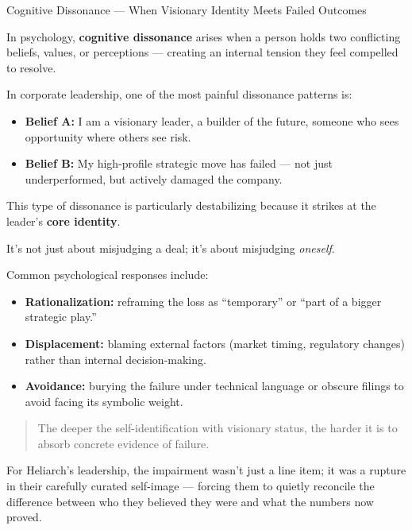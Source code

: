 \begin{PsychologicalSidebar}{Cognitive Dissonance --- When Visionary Identity Meets Failed Outcomes}

    In psychology, \textbf{cognitive dissonance} arises when a person holds two conflicting beliefs, values, or perceptions — creating an internal tension they feel compelled to resolve.
    
    \medskip
    
    In corporate leadership, one of the most painful dissonance patterns is:

    \medskip
    
    \begin{itemize}
        \item \textbf{Belief A:} I am a visionary leader, a builder of the future, someone who sees opportunity where others see risk.
        \item \textbf{Belief B:} My high-profile strategic move has failed — not just underperformed, but actively damaged the company.
    \end{itemize}
    
    \medskip
    
    This type of dissonance is particularly destabilizing because it strikes at the leader’s \textbf{core identity}.

    \medskip
    
    It’s not just about misjudging a deal;  
    it’s about misjudging \textit{oneself}.
    
    \medskip
    
    Common psychological responses include:

    \medskip
    
    \begin{itemize}
        \item \textbf{Rationalization:} reframing the loss as “temporary” or “part of a bigger strategic play.”
        \item \textbf{Displacement:} blaming external factors (market timing, regulatory changes) rather than internal decision-making.
        \item \textbf{Avoidance:} burying the failure under technical language or obscure filings to avoid facing its symbolic weight.
    \end{itemize}
    
    \medskip
    
    \begin{quote}
        The deeper the self-identification with visionary status,  
        the harder it is to absorb concrete evidence of failure.
    \end{quote}
    
    For Heliarch’s leadership, the impairment wasn’t just a line item;  
    it was a rupture in their carefully curated self-image —  
    forcing them to quietly reconcile the difference between who they believed they were  
    and what the numbers now proved.
    
\end{PsychologicalSidebar}

